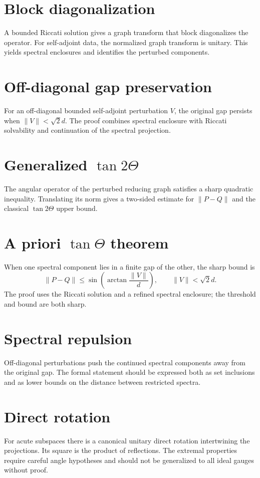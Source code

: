 \documentclass{article}
\begin{document}
\section{Block diagonalization}
A bounded Riccati solution gives a graph transform that block diagonalizes the
operator.  For self-adjoint data, the normalized graph transform is unitary.
This yields spectral enclosures and identifies the perturbed components.

\section{Off-diagonal gap preservation}
For an off-diagonal bounded self-adjoint perturbation $V$, the original gap
persists when $\|V\|<\sqrt2d$.  The proof combines spectral enclosure with
Riccati solvability and continuation of the spectral projection.

\section{Generalized $\tan 2\Theta$}
The angular operator of the perturbed reducing graph satisfies a sharp
quadratic inequality.  Translating its norm gives a two-sided estimate for
$\|P-Q\|$ and the classical $\tan 2\Theta$ upper bound.

\section{A priori $\tan\Theta$ theorem}
When one spectral component lies in a finite gap of the other, the sharp bound
is
\[
 \|P-Q\|\le \sin\!\left(\arctan\frac{\|V\|}{d}\right),
 \qquad \|V\|<\sqrt2d.
\]
The proof uses the Riccati solution and a refined spectral enclosure; the
threshold and bound are both sharp.

\section{Spectral repulsion}
Off-diagonal perturbations push the continued spectral components away from
the original gap.  The formal statement should be expressed both as set
inclusions and as lower bounds on the distance between restricted spectra.

\section{Direct rotation}
For acute subspaces there is a canonical unitary direct rotation intertwining
the projections.  Its square is the product of reflections.  The extremal
properties require careful angle hypotheses and should not be generalized to
all ideal gauges without proof.
\end{document}
